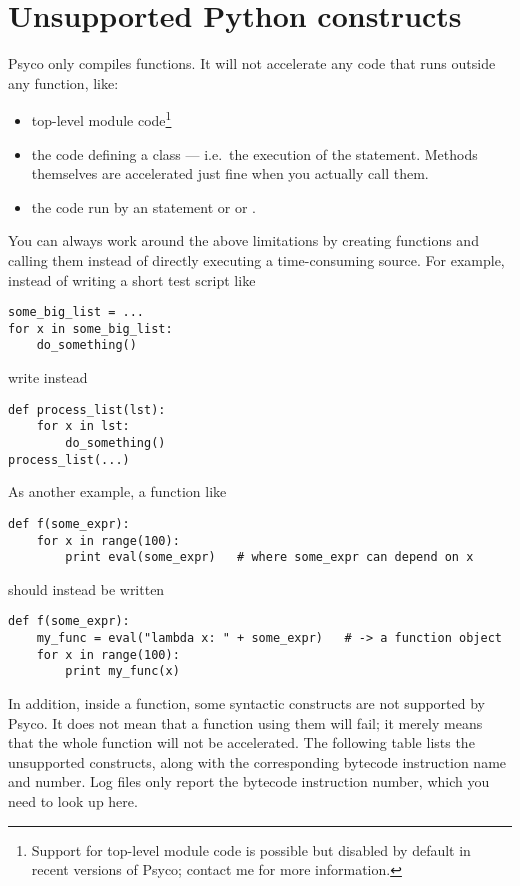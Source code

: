 \documentclass{manual}
\begin{document}
\section{Unsupported Python constructs}\label{unsupported}

Psyco only compiles functions.  It will not accelerate any code that runs outside any function, like:

\begin{itemize}
\item top-level module code\footnote{Support for top-level module code is possible but disabled by default in recent versions of Psyco; contact me for more information.}
\item the code defining a class --- i.e.\ the execution of the  statement.  Methods themselves are accelerated just fine when you actually call them.
\item the code run by an  statement or  or .
\end{itemize}

You can always work around the above limitations by creating functions and calling them instead of directly executing a time-consuming source.  For example, instead of writing a short test script like
%
\begin{verbatim}
some_big_list = ...
for x in some_big_list:
    do_something()
\end{verbatim}
%
write instead
%
\begin{verbatim}
def process_list(lst):
    for x in lst:
        do_something()
process_list(...)
\end{verbatim}

As another example, a function like
%
\begin{verbatim}
def f(some_expr):
    for x in range(100):
        print eval(some_expr)   # where some_expr can depend on x
\end{verbatim}
%
should instead be written
%
\begin{verbatim}
def f(some_expr):
    my_func = eval("lambda x: " + some_expr)   # -> a function object
    for x in range(100):
        print my_func(x)
\end{verbatim}

In addition, inside a function, some syntactic constructs are not supported by Psyco.  It does not mean that a function using them will fail; it merely means that the whole function will not be accelerated.  The following table lists the unsupported constructs, along with the corresponding bytecode instruction name and number.  Log files only report the bytecode instruction number, which you need to look up here.
\end{document}
